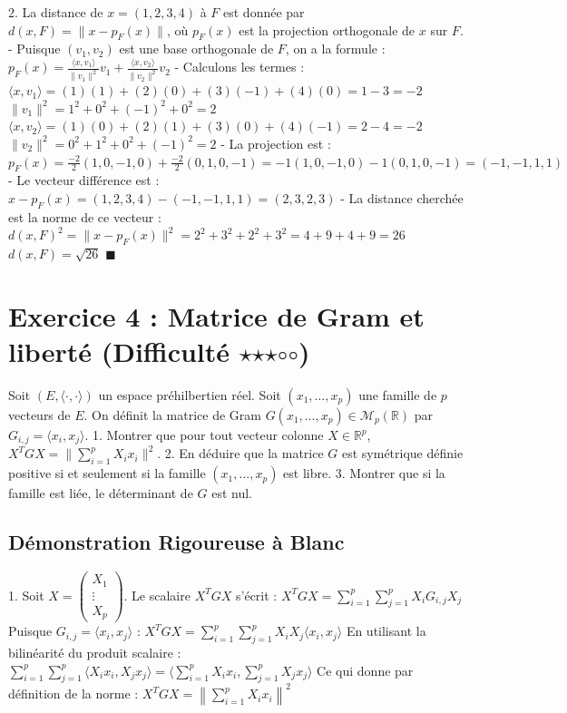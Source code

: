 \documentclass{report}
\begin{document}
2. La distance de $x = (1, 2, 3, 4)$ à $F$ est donnée par $d(x, F) = \|x - p_F(x)\|$, où $p_F(x)$ est la projection orthogonale de $x$ sur $F$.
   - Puisque $(v_1, v_2)$ est une base orthogonale de $F$, on a la formule :
     $ p_F(x) = \frac{\langle x, v_1 \rangle}{\|v_1\|^2} v_1 + \frac{\langle x, v_2 \rangle}{\|v_2\|^2} v_2 $
   - Calculons les termes :
     $ \langle x, v_1 \rangle = (1)(1) + (2)(0) + (3)(-1) + (4)(0) = 1 - 3 = -2 $
     $ \|v_1\|^2 = 1^2 + 0^2 + (-1)^2 + 0^2 = 2 $
     $ \langle x, v_2 \rangle = (1)(0) + (2)(1) + (3)(0) + (4)(-1) = 2 - 4 = -2 $
     $ \|v_2\|^2 = 0^2 + 1^2 + 0^2 + (-1)^2 = 2 $
   - La projection est :
     $ p_F(x) = \frac{-2}{2} (1, 0, -1, 0) + \frac{-2}{2} (0, 1, 0, -1) = -1(1, 0, -1, 0) - 1(0, 1, 0, -1) = (-1, -1, 1, 1) $
   - Le vecteur différence est :
     $ x - p_F(x) = (1, 2, 3, 4) - (-1, -1, 1, 1) = (2, 3, 2, 3) $
   - La distance cherchée est la norme de ce vecteur :
     $ d(x, F)^2 = \|x - p_F(x)\|^2 = 2^2 + 3^2 + 2^2 + 3^2 = 4 + 9 + 4 + 9 = 26 $
     $ d(x, F) = \sqrt{26} $
   $\blacksquare$

\newpage


\chapter*{Exercice 4 : Matrice de Gram et liberté (Difficulté $\star$$\star$$\star$$\circ$$\circ$)}

Soit $(E, \langle \cdot, \cdot \rangle)$ un espace préhilbertien réel. Soit $(x_1, \ldots, x_p)$ une famille de $p$ vecteurs de $E$.
On définit la matrice de Gram $G(x_1, \ldots, x_p) \in \mathcal{M}_p(\mathbb{R})$ par $G_{i,j} = \langle x_i, x_j \rangle$.
1. Montrer que pour tout vecteur colonne $X \in \mathbb{R}^p$, $X^T G X = \|\sum_{i=1}^p X_i x_i\|^2$.
2. En déduire que la matrice $G$ est symétrique définie positive si et seulement si la famille $(x_1, \ldots, x_p)$ est libre.
3. Montrer que si la famille est liée, le déterminant de $G$ est nul.

\section*{Démonstration Rigoureuse à Blanc}

1. Soit $X = \begin{pmatrix} X_1 \\ \vdots \\ X_p \end{pmatrix}$. Le scalaire $X^T G X$ s'écrit :
   $ X^T G X = \sum_{i=1}^p \sum_{j=1}^p X_i G_{i,j} X_j $
   Puisque $G_{i,j} = \langle x_i, x_j \rangle$ :
   $ X^T G X = \sum_{i=1}^p \sum_{j=1}^p X_i X_j \langle x_i, x_j \rangle $
   En utilisant la bilinéarité du produit scalaire :
   $ \sum_{i=1}^p \sum_{j=1}^p \langle X_i x_i, X_j x_j \rangle = \langle \sum_{i=1}^p X_i x_i, \sum_{j=1}^p X_j x_j \rangle $
   Ce qui donne par définition de la norme :
   $ X^T G X = \left\| \sum_{i=1}^p X_i x_i \right\|^2 $
\end{document}
